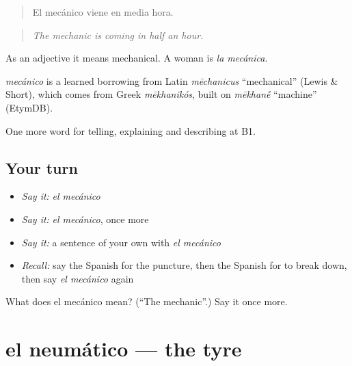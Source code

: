 \begin{quote}
El mecánico viene en media hora.
\end{quote}

\begin{quote}
\emph{The mechanic is coming in half an hour.}
\end{quote}

As an adjective it means mechanical. A woman is \emph{la mecánica}.

\begin{cousinweb}
\emph{mecánico} is a learned borrowing from Latin \emph{mēchanicus} \textquotedblleft{}mechanical\textquotedblright{} (Lewis \& Short), which comes from Greek \emph{mēkhanikós}, built on \emph{mēkhan\'{\={e}}} \textquotedblleft{}machine\textquotedblright{} (EtymDB).
\end{cousinweb}

\begin{grammarlens}[title={What you've built}]
One more word for telling, explaining and describing at B1.
\end{grammarlens}

\subsection*{Your turn}
\begin{itemize}
\raggedright
  \item \emph{Say it:} \emph{el mecánico}
  \item \emph{Say it:} \emph{el mecánico}, once more
  \item \emph{Say it:} a sentence of your own with \emph{el mecánico}
  \item \emph{Recall:} say the Spanish for the puncture, then the Spanish for to break down, then say \emph{el mecánico} again
\end{itemize}

\begin{tcolorbox}[breakable,colback=teal!4,colframe=teal!35!black,title={Before you move on}]
What does el mecánico mean? (\textquotedblleft{}The mechanic\textquotedblright{}.) Say it once more.
\end{tcolorbox}
\section[el neumático]{el neumático — the tyre}

\label{lesson:ES-C645-neumatico}



